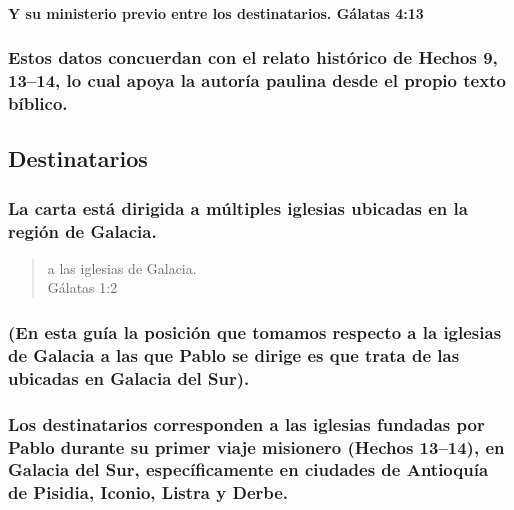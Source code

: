 \documentclass[11a pt,twoside]{article}
\let\oldsubsection\subsection
\renewcommand{\subsection}{\needspace{5\baselineskip}\oldsubsection}
\let\oldsubsubsection\subsubsection
\renewcommand{\subsubsection}{\needspace{4\baselineskip}\oldsubsubsection}
\let\oldparagraph\paragraph
\renewcommand{\paragraph}{\needspace{3\baselineskip}\oldparagraph}
\let\oldcr\\%
\def\\{\oldcr\normalfont}%
\begin{document}
\paragraph{Y su ministerio previo entre los destinatarios. Gálatas
4:13}\label{y-su-ministerio-previo-entre-los-destinatarios.-guxe1latas-413}

\subsubsection{Estos datos concuerdan con el relato histórico de Hechos
9, 13--14, lo cual apoya la autoría paulina desde el propio texto
bíblico.}\label{estos-datos-concuerdan-con-el-relato-histuxf3rico-de-hechos-9-1314-lo-cual-apoya-la-autoruxeda-paulina-desde-el-propio-texto-buxedblico.}

\subsection{Destinatarios}\label{destinatarios}

\subsubsection{La carta está dirigida a múltiples iglesias ubicadas en
la región de
Galacia.}\label{la-carta-estuxe1-dirigida-a-muxfaltiples-iglesias-ubicadas-en-la-regiuxf3n-de-galacia.}

\begin{quote}
a las iglesias de Galacia.\\
Gálatas 1:2
\end{quote}

\subsubsection{(En esta guía la posición que tomamos respecto a la
iglesias de Galacia a las que Pablo se dirige es que trata de las
ubicadas en Galacia del
Sur).}\label{en-esta-guuxeda-la-posiciuxf3n-que-tomamos-respecto-a-la-iglesias-de-galacia-a-las-que-pablo-se-dirige-es-que-trata-de-las-ubicadas-en-galacia-del-sur.}

\subsubsection{Los destinatarios corresponden a las iglesias fundadas
por Pablo durante su primer viaje misionero (Hechos 13--14), en Galacia
del Sur, específicamente en ciudades de Antioquía de Pisidia, Iconio,
Listra y
Derbe.}\label{los-destinatarios-corresponden-a-las-iglesias-fundadas-por-pablo-durante-su-primer-viaje-misionero-hechos-1314-en-galacia-del-sur-especuxedficamente-en-ciudades-de-antioquuxeda-de-pisidia-iconio-listra-y-derbe.}
\end{document}
